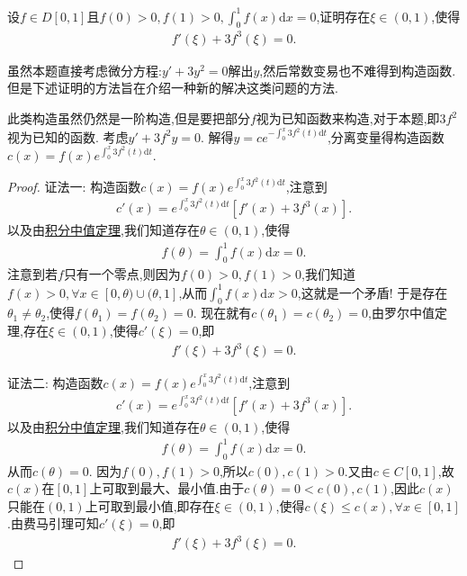 \documentclass[../../main.tex]{subfiles}%
\begin{document}
\begin{example}
设\(f\in D[0,1]\)且\(f(0)>0,f(1)>0,\int_{0}^{1} f(x)\mathrm{d}x = 0\),证明存在\(\xi\in(0,1)\),使得
\begin{align*}
f'(\xi)+3f^{3}(\xi)=0.
\end{align*}
\end{example}
\begin{remark}
虽然本题直接考虑微分方程:$y'+3y^2=0$解出$y$,然后常数变易也不难得到构造函数.但是下述证明的方法旨在介绍一种新的解决这类问题的方法.
\end{remark}
\begin{note}
此类构造虽然仍然是一阶构造,但是要把部分\(f\)视为已知函数来构造,对于本题,即\(3f^{2}\)视为已知的函数. 考虑\(y'+3f^{2}y = 0\). 解得\(y = ce^{-\int_{0}^{x} 3f^{2}(t)\mathrm{d}t}\),分离变量得构造函数\(c(x)=f(x)e^{\int_{0}^{x} 3f^{2}(t)\mathrm{d}t}\).
\end{note}
\begin{proof}

{\color{blue}证法一:}
构造函数\(c(x)=f(x)e^{\int_{0}^{x} 3f^{2}(t)\mathrm{d}t}\),注意到
\begin{align*}
c'(x)=e^{\int_{0}^{x} 3f^{2}(t)\mathrm{d}t}[f'(x)+3f^{3}(x)].
\end{align*}
以及由\hyperref[theorem:积分中值定理]{积分中值定理},我们知道存在\(\theta\in(0,1)\),使得
\begin{align*}
f(\theta)=\int_{0}^{1} f(x)\mathrm{d}x = 0.
\end{align*}
注意到若\(f\)只有一个零点,则因为\(f(0)>0,f(1)>0\),我们知道\(f(x)>0,\forall x\in[0,\theta)\cup(\theta,1]\),从而\(\int_{0}^{1} f(x)\mathrm{d}x>0\),这就是一个矛盾!
于是存在\(\theta_1\neq\theta_2\),使得\(f(\theta_1)=f(\theta_2)=0\). 现在就有\(c(\theta_1)=c(\theta_2)=0\),由罗尔中值定理,存在\(\xi\in(0,1)\),使得\(c'(\xi)=0\),即
\begin{align*}
f'(\xi)+3f^{3}(\xi)=0.
\end{align*}

{\color{blue}证法二:}
构造函数\(c(x)=f(x)e^{\int_{0}^{x} 3f^{2}(t)\mathrm{d}t}\),注意到
\begin{align*}
c'(x)=e^{\int_{0}^{x} 3f^{2}(t)\mathrm{d}t}[f'(x)+3f^{3}(x)].
\end{align*}
以及由\hyperref[theorem:积分中值定理]{积分中值定理},我们知道存在\(\theta\in(0,1)\),使得
\begin{align*}
f(\theta)=\int_{0}^{1} f(x)\mathrm{d}x = 0.
\end{align*}
从而$c(\theta)=0$.
因为$f(0),f(1)>0$,所以$c(0),c(1)>0$.又由$c\in C[0,1]$,故$c(x)$在$[0,1]$上可取到最大、最小值.由于$c(\theta)=0<c(0),c(1)$,因此$c(x)$只能在$(0,1)$上可取到最小值,即存在\(\xi\in(0,1)\),使得$c(\xi)\leqslant  c(x),\forall x\in[0,1]$.由费马引理可知\(c'(\xi)=0\),即
\begin{align*}
f'(\xi)+3f^{3}(\xi)=0.
\end{align*}

\end{proof}
\end{document}
